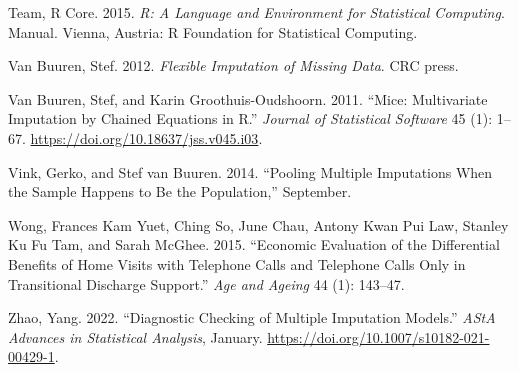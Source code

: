 \documentclass[
]{article}
\newlength{\cslhangindent}
\newlength{\cslentryspacingunit} %
\newenvironment{CSLReferences}[2] %
 {%
  \setlength{\parindent}{0pt}
  \ifodd #1
  \let\oldpar\par
  \def\par{\hangindent=\cslhangindent\oldpar}
  \fi
  \setlength{\parskip}{#2\cslentryspacingunit}
 }%
 {}
\begin{document}
\begin{CSLReferences}{1}{0}
\leavevmode{}%
Team, R Core. 2015. \emph{R: {A} Language and Environment for
Statistical Computing}. Manual. {Vienna, Austria}: {R Foundation for
Statistical Computing}.

\leavevmode{}%
Van Buuren, Stef. 2012. \emph{Flexible Imputation of Missing Data}. {CRC
press}.

\leavevmode{}%
Van Buuren, Stef, and Karin Groothuis-Oudshoorn. 2011. {``Mice:
{Multivariate Imputation} by {Chained Equations} in {R}.''}
\emph{Journal of Statistical Software} 45 (1): 1--67.
\url{https://doi.org/10.18637/jss.v045.i03}.

\leavevmode{}%
Vink, Gerko, and Stef van Buuren. 2014. {``Pooling Multiple Imputations
When the Sample Happens to Be the Population,''} September.

\leavevmode{}%
Wong, Frances Kam Yuet, Ching So, June Chau, Antony Kwan Pui Law,
Stanley Ku Fu Tam, and Sarah McGhee. 2015. {``Economic Evaluation of the
Differential Benefits of Home Visits with Telephone Calls and Telephone
Calls Only in Transitional Discharge Support.''} \emph{Age and Ageing}
44 (1): 143--47.

\leavevmode{}%
Zhao, Yang. 2022. {``Diagnostic Checking of Multiple Imputation
Models.''} \emph{AStA Advances in Statistical Analysis}, January.
\url{https://doi.org/10.1007/s10182-021-00429-1}.

\end{CSLReferences}
\end{document}
